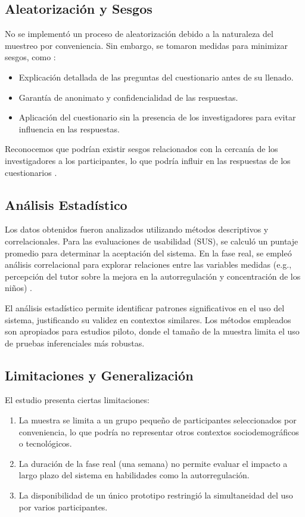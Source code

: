 \documentclass[a4paper,fleqn]{cas-sc}
\begin{document}
		\subsection{Aleatorización y Sesgos}
			No se implementó un proceso de aleatorización debido a la naturaleza del muestreo por conveniencia. Sin embargo, se tomaron medidas para minimizar sesgos, como \citep{Huang2025How}:
			
			\begin{itemize}
				\item Explicación detallada de las preguntas del cuestionario antes de su llenado.
				\item Garantía de anonimato y confidencialidad de las respuestas.
				\item Aplicación del cuestionario sin la presencia de los investigadores para evitar influencia en las respuestas.
			\end{itemize}
				
			Reconocemos que podrían existir sesgos relacionados con la cercanía de los investigadores a los participantes, lo que podría influir en las respuestas de los cuestionarios \citep{DiPietro2025Meta}.
			
		\subsection{Análisis Estadístico}
			Los datos obtenidos fueron analizados utilizando métodos descriptivos y correlacionales. Para las evaluaciones de usabilidad (SUS), se calculó un puntaje promedio para determinar la aceptación del sistema. En la fase real, se empleó análisis correlacional para explorar relaciones entre las variables medidas (e.g., percepción del tutor sobre la mejora en la autorregulación y concentración de los niños) \citep{Wang2025Development}.
				
			El análisis estadístico permite identificar patrones significativos en el uso del sistema, justificando su validez en contextos similares. Los métodos empleados son apropiados para estudios piloto, donde el tamaño de la muestra limita el uso de pruebas inferenciales más robustas.
			
		\subsection{Limitaciones y Generalización}
			El estudio presenta ciertas limitaciones:
				
			\begin{enumerate}
				\item La muestra se limita a un grupo pequeño de participantes seleccionados por conveniencia, lo que podría no representar otros contextos sociodemográficos o tecnológicos.
				\item La duración de la fase real (una semana) no permite evaluar el impacto a largo plazo del sistema en habilidades como la autorregulación.
				\item La disponibilidad de un único prototipo restringió la simultaneidad del uso por varios participantes.
			\end{enumerate}
		
\end{document}
